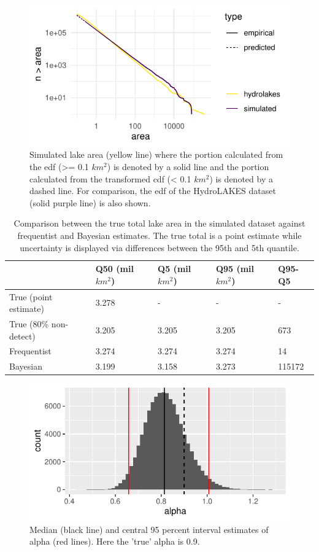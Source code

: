 \documentclass{article}
\begin{document}
\begin{figure}
	\centering
	\includegraphics{figures/predict_censor-1}
	\caption{Simulated lake area (yellow line) where the portion calculated from the edf (>= 0.1 $km^2$) is denoted by a solid line and the portion calculated from the transformed cdf (< 0.1 $km^2$) is denoted by a dashed line. For comparison, the edf of the HydroLAKES dataset (solid purple line) is also shown.}
	\label{fig:predict_censor}
\end{figure}

\begin{table}
	\caption{Comparison between the true total lake area in the simulated dataset against frequentist and Bayesian estimates. The true total is a point estimate while uncertainty is displayed via differences between the 95th and 5th quantile.}
	\centering
	\begin{tabular}{lllll}
		\toprule
		& Q50 (mil $km^2$) & Q5 (mil $km^2$) & Q95 (mil $km^2$) & Q95-Q5 \\
		\midrule
		True (point estimate) & 3.278 & - & - & - \\
		True (80\% non-detect) & 3.205 & 3.205 & 3.205 & 673  \\
		Frequentist & 3.274 & 3.274 & 3.274 & 14  \\
		Bayesian & 3.199 & 3.158 & 3.273 & 115172 \\
		\bottomrule
	   \end{tabular}	
	\label{tab:area}
\end{table}

\begin{figure}
	\centering
	\includegraphics{figures/bayesian_model-1}
	\caption{Median (black line) and central 95 percent interval estimates of alpha (red lines). Here the 'true' alpha is 0.9.}
	\label{fig:bayesian_model}
\end{figure}
\end{document}
